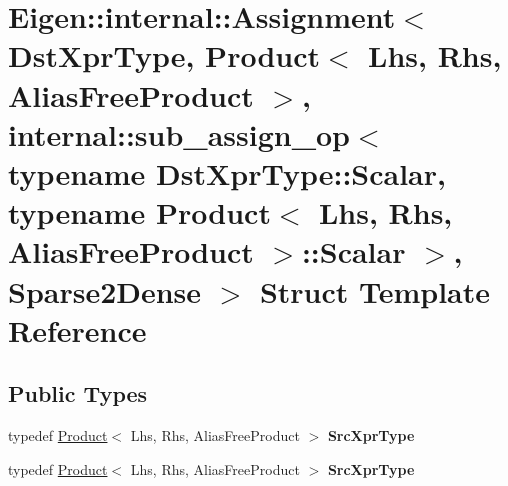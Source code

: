 \hypertarget{struct_eigen_1_1internal_1_1_assignment_3_01_dst_xpr_type_00_01_product_3_01_lhs_00_01_rhs_00_014697dd90e96dca324eed00088adc1a1c}{}\section{Eigen\+:\+:internal\+:\+:Assignment$<$ Dst\+Xpr\+Type, Product$<$ Lhs, Rhs, Alias\+Free\+Product $>$, internal\+:\+:sub\+\_\+assign\+\_\+op$<$ typename Dst\+Xpr\+Type\+:\+:Scalar, typename Product$<$ Lhs, Rhs, Alias\+Free\+Product $>$\+:\+:Scalar $>$, Sparse2\+Dense $>$ Struct Template Reference}
\label{struct_eigen_1_1internal_1_1_assignment_3_01_dst_xpr_type_00_01_product_3_01_lhs_00_01_rhs_00_014697dd90e96dca324eed00088adc1a1c}
\subsection*{Public Types}
\begin{DoxyCompactItemize}
\item 
\mbox{\label{struct_eigen_1_1internal_1_1_assignment_3_01_dst_xpr_type_00_01_product_3_01_lhs_00_01_rhs_00_014697dd90e96dca324eed00088adc1a1c_ac283472d9605669723e1a05fab2cf5ee}} 
typedef \hyperlink{group___core___module_class_eigen_1_1_product}{Product}$<$ Lhs, Rhs, Alias\+Free\+Product $>$ {\bfseries Src\+Xpr\+Type}
\item 
\mbox{\label{struct_eigen_1_1internal_1_1_assignment_3_01_dst_xpr_type_00_01_product_3_01_lhs_00_01_rhs_00_014697dd90e96dca324eed00088adc1a1c_ac283472d9605669723e1a05fab2cf5ee}} 
typedef \hyperlink{group___core___module_class_eigen_1_1_product}{Product}$<$ Lhs, Rhs, Alias\+Free\+Product $>$ {\bfseries Src\+Xpr\+Type}
\end{DoxyCompactItemize}
